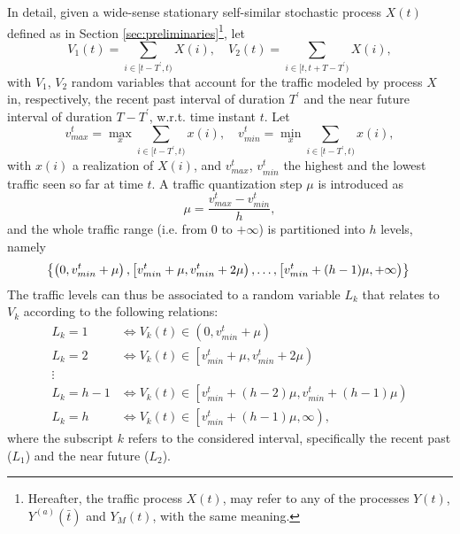 \documentclass[journal,10pt,twoside,final]{IEEEtran}
\begin{document}
In detail, given a wide-sense stationary self-similar stochastic process $X(t)$ defined as in Section \ref{sec:preliminaries}\footnote{Hereafter, the traffic process  $X(t)$, may refer to any of the processes $Y(t)$, $Y^{(a)}(\bar t)$ and $Y_M(t)$, with the same meaning.}, let
\begin{equation}
V_1(t) = \sum_{i \in [t-T^\prime, t)}X(i),\quad V_2(t) = \sum_{i \in [t, t + T - T^\prime)}X(i), 
\end{equation} 
with $V_1$, $V_2$ random variables that account for the traffic modeled by process $X$ in, respectively, the recent past interval of duration $T^{\prime}$ and the near future interval of duration $T-T^\prime$, w.r.t. time instant $t$. Let
\begin{equation}
\label{eq:trafficLimits}
v_{max}^t = \max_{x} \sum_{i \in [t-T^\prime, t)}x(i), \quad v_{min}^t = \min_{x} \sum_{i \in [t-T^\prime, t)}x(i), 
\end{equation} 
with $x(i)$ a realization of $X(i)$, and $v_{max}^t$, $v_{min}^t$ the highest and the lowest traffic seen so far at time $t$. 
A traffic quantization step $\mu$ is introduced as  
\begin{equation}
\label{eq:trafficMu}
\mu = \frac{v_{max}^t - v_{min}^t}{h},
\end{equation}
and the whole traffic range (i.e. from $0$ to $+\infty$) is partitioned into $h$ levels, namely
\begin{equation}
\hspace{-1.0mm}
\left\{\left(0,v_{min}^t + \mu \right), 
         \left[v_{min}^t + \mu , v_{min}^t + 2\mu \right), 
         \dots,
         \left[v_{min}^t + (h-1)\mu, +\infty \right)\right\}
\end{equation}
The traffic levels can thus be associated to a random variable $L_k$ that relates to $V_k$ according to the following relations:
\begin{align}
L_k = 1 & \Leftrightarrow V_k (t) \in \left(0,v_{min}^t + \mu \right)\\
L_k = 2 & \Leftrightarrow V_k (t) \in \left[v_{min}^t + \mu , v_{min}^t + 2\mu \right)\\
 \vdots \nonumber\\
L_k = h-1 & \Leftrightarrow V_k (t) \in \left[v_{min}^t + (h-2)\mu, v_{min}^t + (h-1)\mu \right)\\
L_k = h & \Leftrightarrow V_k (t) \in \left[v_{min}^t + (h-1)\mu, \infty \right),
\end{align}
where the subscript $k$ refers to the considered interval, specifically the recent past ($L_1$) and the near future ($L_2$).
\end{document}
